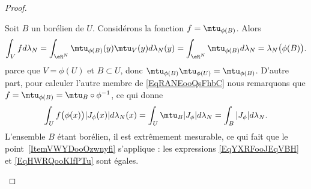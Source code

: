 \begin{proof}
\begin{enumerate}
\begin{subproof}
			      Soit \( B\) un borélien de \( U\). Considérons la fonction \( f=\mtu_{\phi(B)}\). Alors
			      \begin{equation}    \label{EqYXRFooJEqVBH}
				      \int_V fd\lambda_N=\int_{\eR^N}\mtu_{\phi(B)}(y)\mtu_V(y)d\lambda_N(y)
				      =\int_{\eR^N}\mtu_{\phi(B)}d\lambda_N
				      =\lambda_N\big( \phi(B) \big).
			      \end{equation}
			      parce que \( V=\phi(U)\) et \( B\subset U\), donc \( \mtu_{\phi(B)}\mtu_{\phi(U)}=\mtu_{\phi(B)}\). D'autre part, pour calculer l'autre membre de \eqref{EqRANEooQsFhbC} nous remarquons que \( f=\mtu_{\phi(B)}=\mtu_B\circ\phi^{-1}\), ce qui donne
			      \begin{equation}        \label{EqHWRQooKIfPTu}
				      \int_Uf\big( \phi(x) \big)| J_{\phi}(x) |d\lambda_N(x)=\int_U\mtu_B| J_{\phi} |d\lambda_N=\int_B| J_{\phi} |d\lambda_N.
			      \end{equation}
			      L'ensemble \( B\) étant borélien, il est extrêmement mesurable, ce qui fait que le point~\ref{ItemVWYDooOzwnyfi} s'applique : les expressions \eqref{EqYXRFooJEqVBH} et \eqref{EqHWRQooKIfPTu} sont égales.



\end{subproof}
\end{enumerate}
\end{proof}
